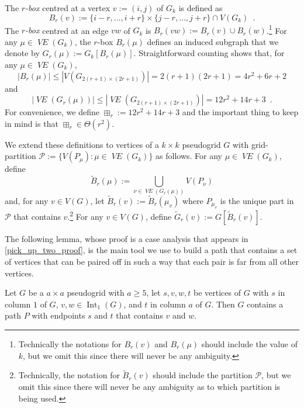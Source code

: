 \documentclass{patmorin}
\newcommand{\vol}[1]{\boxplus_{#1}}
\DeclareMathOperator{\interior}{Int}
\newcommand{\defin}[1]{\emph{\color{brightmaroon}#1}}
\DeclareMathOperator{\VE}{\mathit{VE}}
\begin{document}
The \defin{$r$-box} centred at a vertex $v:=(i,j)$ of $G_{k}$ is defined as
\[
  B_r(v) := \{i-r,\ldots,i+r\}\times\{j-r,\ldots,j+r\} \cap V(G_{k}) \enspace .
\]
The \defin{$r$-box} centred at an edge $vw$ of $G_{k}$ is $B_r(vw):=B_r(v)\cup B_r(w)$.\footnote{Technically the notations for $B_r(v)$ and $B_r(\mu)$ should include the value of $k$, but we omit this since there will never be any ambiguity.}
For any $\mu\in\VE(G_k)$, the $r$-box $B_r(\mu)$ defines an induced subgraph that we denote by $G_r(\mu):=G_{k}[B_r(\mu)]$.  Straightforward counting shows that, for any $\mu\in\VE(G_k)$,
\[
   |B_r(\mu)| \le |V(G_{2(r+1)\times (2r+1)})| = 2(r+1)(2r+1) = 4r^2+6r+2
\]
and
\begin{equation}
   |\VE(G_r(\mu))| \le |\VE(G_{2(r+1)\times (2r+1)})| = 12r^2+14r+3 \enspace . \label{rbox_size}
\end{equation}
For convenience, we define $\vol{r}:=12r^2+14r+3$ and the important thing to  keep in mind is that $\vol{r} \in\Theta(r^2)$.
%

We extend these definitions to vertices of a $k\times k$ pseudogrid $G$ with grid-partition $\mathcal{P}:=\{V(P_\mu):\mu\in\VE(G_k)\}$ as follows. For any $\mu\in\VE(G_k)$, define
\[
   \tilde{B}_r(\mu) := \bigcup_{\nu\in \VE(G_r(\mu))} V(P_\nu)
\]
and, for any $v\in V(G)$, let $\tilde{B}_r(v):=\tilde{B}_r(\mu_v)$ where $P_{\mu_v}$ is the unique part in $\mathcal{P}$ that contains $v$.\footnote{Technically, the notation for $\tilde{B}_r(v)$ should include the partition $\mathcal{P}$, but we omit this since there will never be any ambiguity as to which partition is being used.}
For any $v\in V(G)$, define $\tilde{G}_r(v):=G[\tilde{B}_r(v)]$.

The following lemma, whose proof is a case analysis that appears in \cref{pick_up_two_proof}, is the main tool we use to build a path that contains a set of vertices that can be paired off in such a way that each pair is far from all other vertices.

\begin{lem}\label{pick_up_two}
  Let $G$ be a $a\times a$ pseudogrid with $a\ge 5$,  let $s,v,w,t$ be vertices of $G$ with $s$ in column $1$ of $G$, $v,w\in\interior_1(G)$, and $t$ in column $a$ of $G$.  Then $G$ contains a path $P$ with endpoints $s$ and $t$ that contains $v$ and $w$.
\end{lem}
\end{document}
